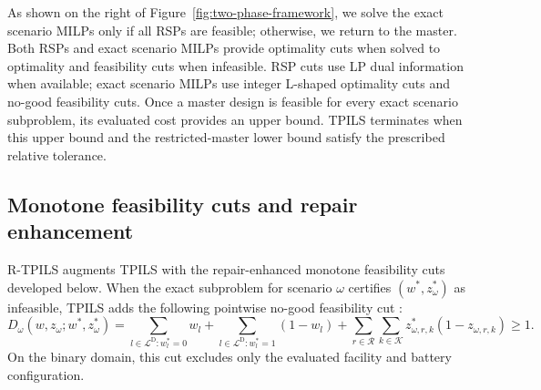 As shown on the right of Figure~\ref{fig:two-phase-framework}, we solve the exact scenario MILPs only if all RSPs are feasible; otherwise, we return to the master.
Both RSPs and exact scenario MILPs provide optimality cuts when solved to optimality and feasibility cuts when infeasible.
RSP cuts use LP dual information when available; exact scenario MILPs use integer L-shaped optimality cuts \citep{laporte_integer_1993} and no-good feasibility cuts.
Once a master design is feasible for every exact scenario subproblem, its evaluated cost provides an upper bound.
TPILS terminates when this upper bound and the restricted-master lower bound satisfy the prescribed relative tolerance.

\subsection{Monotone feasibility cuts and repair enhancement}
\label{subsec:resource-monotonicity}

R-TPILS augments TPILS with the repair-enhanced monotone feasibility cuts developed below.
When the exact subproblem for scenario $\omega$ certifies $(w^*,z_\omega^*)$ as infeasible, TPILS adds the following pointwise no-good feasibility cut \citep{elci_stochastic_2022}:
\begin{equation}
 D_\omega(w,z_\omega;w^*,z_\omega^*)=
 \sum_{l\in\mathcal L^{\mathrm D}:w_l^*=0}w_l
 +\sum_{l\in\mathcal L^{\mathrm D}:w_l^*=1}(1-w_l)
 +\sum_{r\in\mathcal R}\sum_{k\in\mathcal K}z_{\omega,r,k}^*(1-z_{\omega,r,k})\ge1.
\label{eq:pointwise-feasibility-cut}
\end{equation}
On the binary domain, this cut excludes only the evaluated facility and battery configuration.
